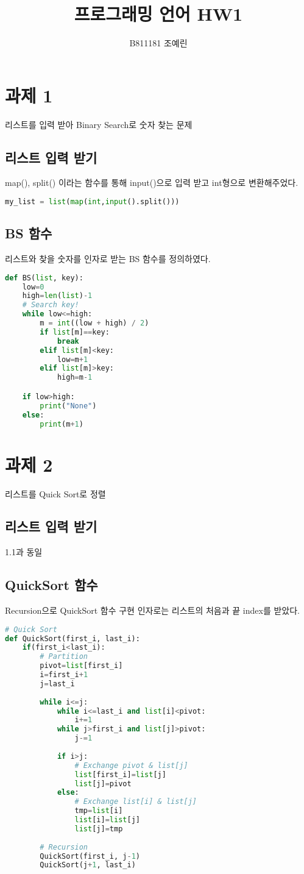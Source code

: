\documentclass{article}
\begin{document}
	\title{프로그래밍 언어 HW1}
	\author{B811181 조예린}
	\maketitle
	
	\section{과제 1}
	리스트를 입력 받아 Binary Search로 숫자 찾는 문제
	\subsection{리스트 입력 받기}
	map(), split() 이라는 함수를 통해 input()으로 입력 받고 int형으로 변환해주었다.
	\begin{lstlisting}[language=Python]
	my_list = list(map(int,input().split()))
	\end{lstlisting}
	\subsection{BS 함수}
	리스트와 찾을 숫자를 인자로 받는 BS 함수를 정의하였다.
	\begin{lstlisting}[language=Python]
def BS(list, key):
	low=0
	high=len(list)-1
	# Search key!
	while low<=high:
		m = int((low + high) / 2)
		if list[m]==key:
			break
		elif list[m]<key:
			low=m+1
		elif list[m]>key:
			high=m-1

	if low>high:
		print("None")
	else:
		print(m+1)
	\end{lstlisting}
	
	
	\section{과제 2}
	리스트를 Quick Sort로 정렬
	\subsection{리스트 입력 받기}
	1.1과 동일
	\subsection{QuickSort 함수}
	Recursion으로 QuickSort 함수 구현
	인자로는 리스트의 처음과 끝 index를 받았다.
	\begin{lstlisting}[language=Python]
# Quick Sort
def QuickSort(first_i, last_i):
	if(first_i<last_i):
		# Partition
		pivot=list[first_i]
		i=first_i+1
		j=last_i
	
		while i<=j:
			while i<=last_i and list[i]<pivot:
				i+=1
			while j>first_i and list[j]>pivot:
				j-=1
	
			if i>j:
				# Exchange pivot & list[j]
				list[first_i]=list[j]
				list[j]=pivot
			else:
				# Exchange list[i] & list[j]
				tmp=list[i]
				list[i]=list[j]
				list[j]=tmp
				
		# Recursion
		QuickSort(first_i, j-1)
		QuickSort(j+1, last_i)
	\end{lstlisting}
\end{document}
